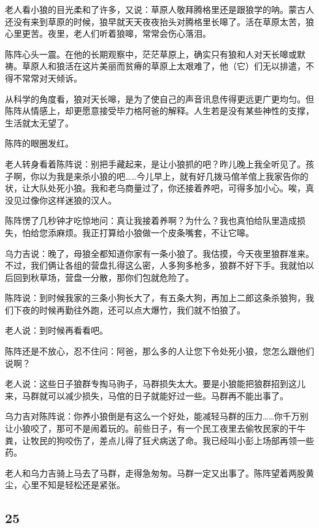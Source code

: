 \par 老人看小狼的目光柔和了许多，又说：草原人敬拜腾格里还是跟狼学的呐。蒙古人还没有来到草原的时候，狼早就天天夜夜抬头对腾格里长嗥了。活在草原太苦，狼心里更苦。夜里，老人们听着狼嗥，常常会伤心落泪。
\par 陈阵心头一震。在他的长期观察中，茫茫草原上，确实只有狼和人对天长嗥或默祷。草原人和狼活在这片美丽而贫瘠的草原上太艰难了，他（它）们无以排遣，不得不常常对天倾诉。
\par 从科学的角度看，狼对天长嗥，是为了使自己的声音讯息传得更远更广更均匀。但陈阵从情感上，却更愿意接受毕力格阿爸的解释。人生若是没有某些神性的支撑，生活就太无望了。
\par 陈阵的眼圈发红。
\par 老人转身看着陈阵说：别把手藏起来，是让小狼抓的吧？昨儿晚上我全听见了。孩子啊，你以为我是来杀小狼的吧……今儿早上，就有好几拨马倌羊倌上我家告你的状，让大队处死小狼。我和老乌商量过了，你还接着养吧，可得多加小心。唉，真没见过像你这样迷狼的汉人。
\par 陈阵愣了几秒钟才吃惊地问：真让我接着养啊？为什么？我也真怕给队里造成损失，怕给您添麻烦。我正打算给小狼做一个皮条嘴套，不让它嗥。
\par 乌力吉说：晚了，母狼全都知道你家有一条小狼了。我估摸，今天夜里狼群准来。不过，我们俩让各组的营盘扎得这么密，人多狗多枪多，狼群不好下手。我就怕以后回到秋草场，营盘一分散，那你们包就危险了。
\par 陈阵说：到时候我家的三条小狗长大了，有五条大狗，再加上二郎这条杀狼狗，我们下夜的时候再勤往外跑，还可以点大爆竹，我们就不怕狼了。
\par 老人说：到时候再看看吧。
\par 陈阵还是不放心，忍不住问：阿爸，那么多的人让您下令处死小狼，您怎么跟他们说啊？
\par 老人说：这些日子狼群专掏马驹子，马群损失太大。要是小狼能把狼群招到这儿来，马群就可以减少损失，马倌的日子就能好过一些。马群再不能出事了。
\par 乌力吉对陈阵说：你养小狼倒是有这么一个好处，能减轻马群的压力……你千万别让小狼咬了，那可不是闹着玩的。前些日子，有一个民工夜里去偷牧民家的干牛粪，让牧民的狗咬伤了，差点儿得了狂犬病送了命。我已经叫小彭上场部再领一些药。
\par 老人和乌力吉骑上马去了马群，走得急匆匆。马群一定又出事了。陈阵望着两股黄尘，心里不知是轻松还是紧张。





\subsection*{25}

